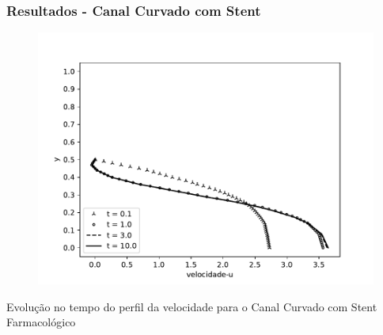 \begin{frame}
 \frametitle{\Large Resultados - Canal Curvado com Stent}
\begin{figure}
  \centering
  \vspace{-1.5cm}
  \includegraphics[scale=0.59]{images/vel_CurvedStrut_evol.pdf}\\
\end{figure}
\vspace{-0.2cm}
\centering \scriptsize Evolução no tempo do perfil da velocidade para o Canal Curvado com Stent Farmacológico
\end{frame}


